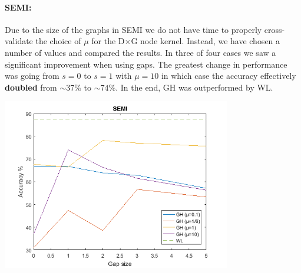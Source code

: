 \documentclass{article}
\begin{document}
\paragraph{SEMI:}
Due to the size of the graphs in SEMI we do not have time to properly cross-validate the choice of $\mu$ for the D$\times$G node kernel. Instead, we have chosen a number of values and compared the results.
In three of four cases we saw a significant improvement when using gaps. The greatest change in performance was going from $s=0$ to $s=1$ with $\mu=10$ in which case the accuracy effectively \textbf{doubled} from $\sim 37\%$ to $\sim 74\%$. In the end, GH was outperformed by WL.
\\
\begin{minipage}{0.6\linewidth}
	\hspace*{-1in}
	\includegraphics[width=10cm]{semi}
	\label{fig:semi}
\end{minipage}
\end{document}
